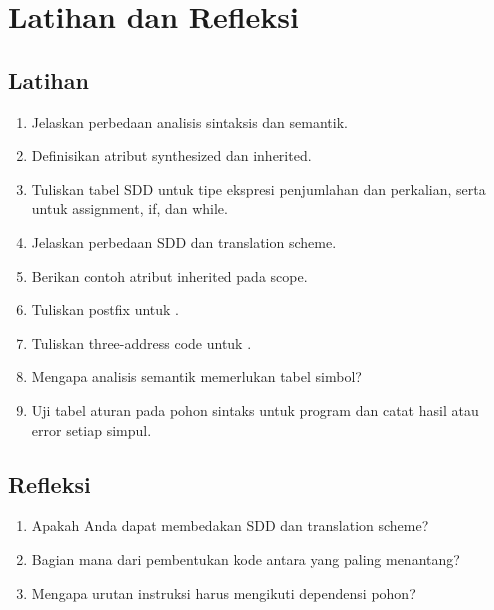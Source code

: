 \section*{Latihan dan Refleksi}

\subsection*{Latihan}
\begin{enumerate}[label=\arabic*.,leftmargin=*]
  \item Jelaskan perbedaan analisis sintaksis dan semantik.
  \item Definisikan atribut synthesized dan inherited.
  \item Tuliskan tabel SDD untuk tipe ekspresi penjumlahan dan
        perkalian, serta untuk assignment, if, dan while.
  \item Jelaskan perbedaan SDD dan translation scheme.
  \item Berikan contoh atribut inherited pada scope.
  \item Tuliskan postfix untuk .
  \item Tuliskan three-address code untuk .
  \item Mengapa analisis semantik memerlukan tabel simbol?
  \item Uji tabel aturan pada pohon sintaks untuk program
         dan catat hasil atau error
        setiap simpul.
\end{enumerate}

\subsection*{Refleksi}
\begin{reflectionbox}
\begin{enumerate}[label=\arabic*.,leftmargin=*]
  \item Apakah Anda dapat membedakan SDD dan translation scheme?
  \item Bagian mana dari pembentukan kode antara yang paling menantang?
  \item Mengapa urutan instruksi harus mengikuti dependensi pohon?
\end{enumerate}
\end{reflectionbox}
